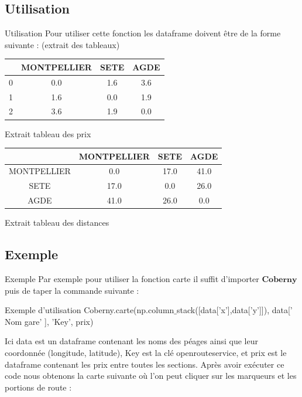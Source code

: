 \documentclass{beamer}
\begin{document}
\subsection{Utilisation}
\begin{frame}[fragile]{Utilisation}
Pour utiliser cette fonction les dataframe doivent être de la forme suivante : (extrait des tableaux)
\begin{center}
\begin{tabular}{|*{4}{c|}}
\hline
&MONTPELLIER&SETE&AGDE \\
\hline
0&0.0&1.6&3.6\\
\hline
1&1.6&0.0&1.9 \\
\hline
2&3.6&1.9&0.0\\
\hline
\end{tabular} \newline
Extrait tableau des prix
\end{center}
\begin{center}
\begin{tabular}{|*{4}{c|}}
\hline
&MONTPELLIER&SETE&AGDE \\
\hline
MONTPELLIER&0.0&17.0&41.0\\
\hline
SETE&17.0&0.0&26.0 \\
\hline
AGDE&41.0&26.0&0.0\\
\hline
\end{tabular} \newline
Extrait tableau des distances
\end{center}
\end{frame}

\subsection{Exemple}
\begin{frame}[fragile]{Exemple}
Par exemple pour utiliser la fonction carte il suffit d'importer $\textbf{Coberny}$ puis de taper la commande suivante : 
\begin{block}{Exemple d'utilisation}
Coberny.carte(np.column$\_$stack([data['x'],data['y']]), data[' Nom gare' ], 'Key', prix)
\end{block}
Ici data est un dataframe contenant les noms des péages ainsi que leur coordonnée (longitude, latitude), Key est la clé openrouteservice, et prix est le dataframe contenant les prix entre toutes les sections.
Après avoir exécuter ce code nous obtenons la carte suivante où l'on peut cliquer sur les marqueurs et les portions de route : 
\end{frame}
\end{document}
